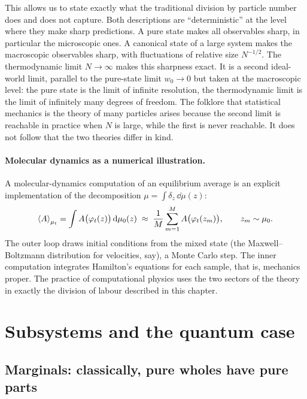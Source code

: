 This allows us to state exactly what the traditional division by particle number does and does not capture. Both descriptions are ``deterministic'' at the level where they make sharp predictions. A pure state makes all observables sharp, in particular the microscopic ones. A canonical state of a large system makes the macroscopic observables sharp, with fluctuations of relative size $N^{-1/2}$. The thermodynamic limit $N\to\infty$ makes this sharpness exact. It is a second ideal-world limit, parallel to the pure-state limit $w_0\to0$ but taken at the macroscopic level: the pure state is the limit of infinite resolution, the thermodynamic limit is the limit of infinitely many degrees of freedom. The folklore that statistical mechanics is the theory of many particles arises because the second limit is reachable in practice when $N$ is large, while the first is never reachable. It does not follow that the two theories differ in kind.

\paragraph{Molecular dynamics as a numerical illustration.} A molecular-dynamics computation of an equilibrium average is an explicit implementation of the decomposition $\mu=\int\delta_z\,\dd\mu(z)$:
\begin{equation}
\left\langle A\right\rangle_{\mu_t}=\int A\bigl(\varphi_t(z)\bigr)\,\mathrm{d}\mu_0(z)\;\approx\;\frac1M\sum_{m=1}^{M}A\bigl(\varphi_t(z_m)\bigr),\qquad z_m\sim\mu_0.
\end{equation}
The outer loop draws initial conditions from the mixed state (the Maxwell--Boltzmann distribution for velocities, say), a Monte Carlo step. The inner computation integrates Hamilton's equations for each sample, that is, mechanics proper. The practice of computational physics uses the two sectors of the theory in exactly the division of labour described in this chapter.

\section{Subsystems and the quantum case}
\label{sec:subsystems}

\subsection{Marginals: classically, pure wholes have pure parts}


